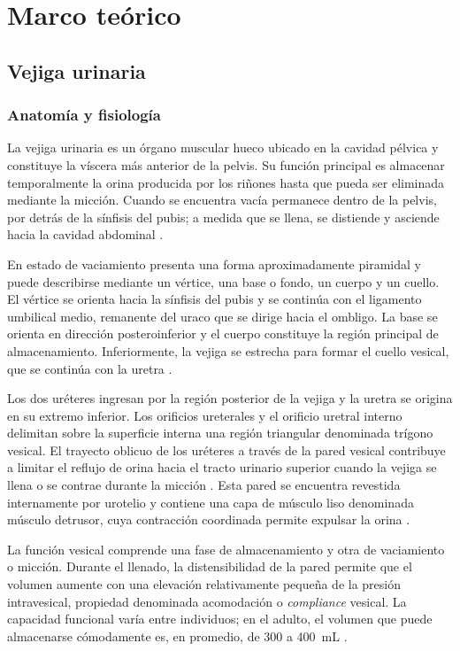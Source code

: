 \documentclass[12pt,a4paper]{article}
\begin{document}
\section{Marco teórico}

\subsection{Vejiga urinaria}

\subsubsection{Anatomía y fisiología}

La vejiga urinaria es un órgano muscular hueco ubicado en la cavidad pélvica y constituye la víscera
más anterior de la pelvis. Su función principal es almacenar temporalmente la orina producida por los
riñones hasta que pueda ser eliminada mediante la micción. Cuando se encuentra vacía permanece dentro
de la pelvis, por detrás de la sínfisis del pubis; a medida que se llena, se distiende y asciende hacia
la cavidad abdominal \cite{drake2015gray,shermadou2023bladder}.

En estado de vaciamiento presenta una forma aproximadamente piramidal y puede describirse mediante un
vértice, una base o fondo, un cuerpo y un cuello. El vértice se orienta hacia la sínfisis del pubis y
se continúa con el ligamento umbilical medio, remanente del uraco que se dirige hacia el ombligo. La
base se orienta en dirección posteroinferior y el cuerpo constituye la región principal de
almacenamiento. Inferiormente, la vejiga se estrecha para formar el cuello vesical, que se continúa con
la uretra \cite{drake2015gray,shermadou2023bladder}.

Los dos uréteres ingresan por la región posterior de la vejiga y la uretra se origina en su extremo
inferior. Los orificios ureterales y el orificio uretral interno delimitan sobre la superficie interna
una región triangular denominada trígono vesical. El trayecto oblicuo de los uréteres a través de la
pared vesical contribuye a limitar el reflujo de orina hacia el tracto urinario superior cuando la
vejiga se llena o se contrae durante la micción \cite{lanzotti2023physiology}. Esta pared se encuentra
revestida internamente por urotelio y contiene una capa de músculo liso denominada músculo detrusor,
cuya contracción coordinada permite expulsar la orina \cite{drake2015gray}.

La función vesical comprende una fase de almacenamiento y otra de vaciamiento o micción. Durante el
llenado, la distensibilidad de la pared permite que el volumen aumente con una elevación relativamente
pequeña de la presión intravesical, propiedad denominada acomodación o \textit{compliance} vesical. La
capacidad funcional varía entre individuos; en el adulto, el volumen que puede almacenarse cómodamente
es, en promedio, de 300 a 400~mL \cite{drake2015gray,lanzotti2023physiology}.
\end{document}
